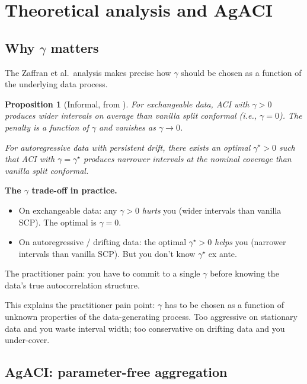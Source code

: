 \documentclass[letterpaper,11pt,leqno]{article}
\newtheorem*{propstar}{Proposition}
\begin{document}
\section{Theoretical analysis and AgACI}\label{s:result}

\subsection*{Why $\gamma$ matters}

The Zaffran et al.\ analysis makes precise how $\gamma$ should be chosen as a function of the underlying data process.

\begin{propstar}[Informal, from \cite{zaffran2022aci}]
For \emph{exchangeable} data, ACI with $\gamma > 0$ produces \emph{wider} intervals on average than vanilla split conformal (i.e., $\gamma = 0$). The penalty is a function of $\gamma$ and vanishes as $\gamma \to 0$.

For \emph{autoregressive} data with persistent drift, there exists an optimal $\gamma^{\star} > 0$ such that ACI with $\gamma = \gamma^{\star}$ produces \emph{narrower} intervals at the nominal coverage than vanilla split conformal.
\end{propstar}

\begin{explain}
\textbf{The $\gamma$ trade-off in practice.}
\begin{itemize}
\item On exchangeable data: any $\gamma > 0$ \emph{hurts} you (wider intervals than vanilla SCP). The optimal is $\gamma = 0$.
\item On autoregressive / drifting data: the optimal $\gamma^{\star} > 0$ \emph{helps} you (narrower intervals than vanilla SCP). But you don't know $\gamma^{\star}$ ex ante.
\end{itemize}
The practitioner pain: you have to commit to a single $\gamma$ before knowing the data's true autocorrelation structure.
\end{explain}

This explains the practitioner pain point: $\gamma$ has to be chosen as a function of unknown properties of the data-generating process. Too aggressive on stationary data and you waste interval width; too conservative on drifting data and you under-cover.

\subsection*{AgACI: parameter-free aggregation}
\end{document}
